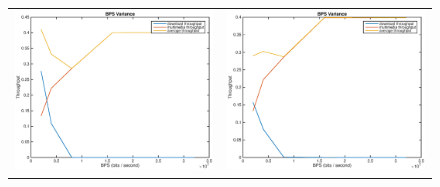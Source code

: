 \begin{figure}
\begin{tabular}{cc}
\includegraphics[scale=0.35]{../../src/fig-simulation_download_multimedia-bps-1_1_5_10_12000.eps} & \includegraphics[scale=0.35]{../../src/fig-simulation_download_multimedia-bps-1_1_5_25_12000.eps}

\end{tabular}
\end{figure}

